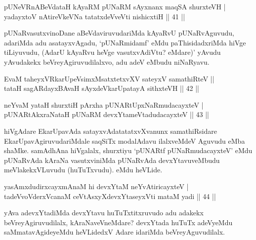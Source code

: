 
\begin{shl}
pUNeVRnABeVdataH kAyaRM pUNaRM sAyxnanx maqSA shurxteVH  | \\
yadayxtoV nAtireVkeVNa tatatxdeVveVti nishicxtiH \hfill||  41 ||  
\end{shl}

\begin{artha}
pUNaRvasutxvinoDane aBeVdaviruvudariMda kAyaRvU pUNaRvAguvudu, adariMda adu asatayxvAgadu, `pUNaRmidamf' eMdu paThisidadxriMda hiVge tiLiyuvudu, (AdarU kAyaRvu heVge vasutxvAdiVtu? eMdare)' yAvudu yAvudakekx beVreyAgiruvudilalxvo, adu adeV eMbudu niNaRyavu.
\end{artha}


\begin{shl}
EvaM taheyxVRkarUpeV\s simxMsatxtetxvXV sateyxV samathiRteV ||  \\
tataH sagARdayxBAvaH sAyxdeVkarUpatayA sithxteVH \hfill||  42 ||  
\end{shl}

\begin{shl}
neYvaM yataH shurxtiH pArxha pUNARtUpxNaRmudacayxteV  | \\
pUNARtAkxraNataH pUNaRM devxYtameVtadudacayxteV \hfill||  43 ||  
\end{shl}

\begin{artha}
hiVgAdare EkarUpavAda satayxvAdatatatxvXvanunx samathiRsidare EkarUpavAgiruvudariMdale saqSiTx modalAdavu ilalxveMdeV Aguvudu \mdash  eMba shaMke. \mdash  samAdhAna \mdash  hiVgalalx, shurxtiyu `pUNARtf pUNaRmudacayxteV' eMdu pUNaRvAda kAraNa vasutxviniMda pUNaRvAda devxYtavuveMbudu meVlakekxVLuvudu (huTuTxvudu). eMdu heVLide.
\end{artha}



\begin{shl}
yasAmxdudirxcayxmAnaM hi devxYtaM neYvAtiricayxteV  | \\
tadeVvoVderxVcanaM ceVtAsxyXdevxYtaseyxVti mataM yadi \hfill||  44 ||  
\end{shl}

\begin{artha}
yAva adevxYtadiMda devxYtavu huTuTxtitxruvudo adu adakekx beVreyAgiruvudilalx, kAraNaveVneMdare? devxYtada huTuTx adeVyeMdu saMmatavAgideyeMdu heVLidedxV Adare idariMda beVreyAguvudilalx.
\end{artha}

